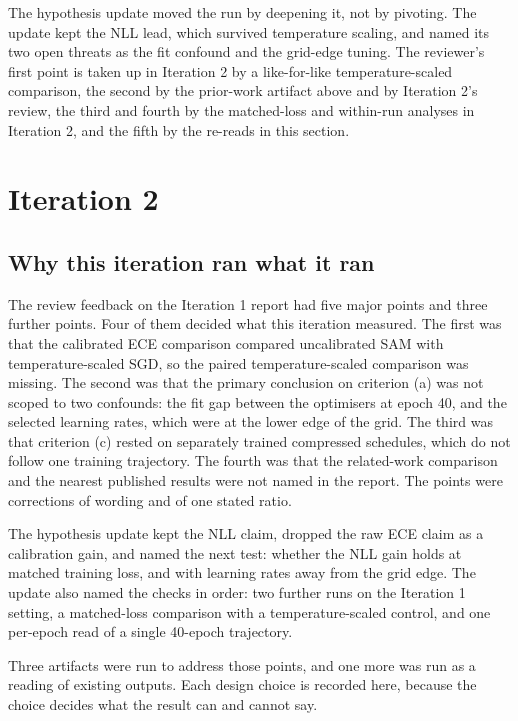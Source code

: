 \documentclass[11pt,letterpaper]{article}
\begin{document}
The hypothesis update moved the run by deepening it, not by pivoting. The update kept the NLL lead, which survived temperature scaling, and named its two open threats as the fit confound and the grid-edge tuning. The reviewer's first point is taken up in Iteration 2 by a like-for-like temperature-scaled comparison, the second by the prior-work artifact above and by Iteration 2's review, the third and fourth by the matched-loss and within-run analyses in Iteration 2, and the fifth by the re-reads in this section.

\section{Iteration 2}

\subsection{Why this iteration ran what it ran}

The review feedback on the Iteration 1 report had five major points and three further points. Four of them decided what this iteration measured. The first was that the calibrated ECE comparison compared uncalibrated SAM with temperature-scaled SGD, so the paired temperature-scaled comparison was missing. The second was that the primary conclusion on criterion (a) was not scoped to two confounds: the fit gap between the optimisers at epoch 40, and the selected learning rates, which were at the lower edge of the grid. The third was that criterion (c) rested on separately trained compressed schedules, which do not follow one training trajectory. The fourth was that the related-work comparison and the nearest published results were not named in the report. The points were corrections of wording and of one stated ratio.

The hypothesis update kept the NLL claim, dropped the raw ECE claim as a calibration gain, and named the next test: whether the NLL gain holds at matched training loss, and with learning rates away from the grid edge. The update also named the checks in order: two further runs on the Iteration 1 setting, a matched-loss comparison with a temperature-scaled control, and one per-epoch read of a single 40-epoch trajectory.

Three artifacts were run to address those points, and one more was run as a reading of existing outputs. Each design choice is recorded here, because the choice decides what the result can and cannot say.
\end{document}
